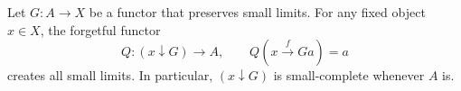 Let $G : A \rightarrow X$ be a functor that preserves small limits. For any fixed object $x \in X$, the forgetful functor
$$Q : (x \downarrow G) \rightarrow A, \qquad Q(x \stackrel{f}{\rightarrow} G a) = a$$
creates all small limits. In particular, $(x \downarrow G)$ is small-complete whenever $A$ is.
